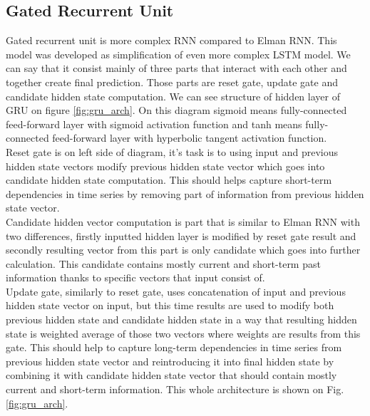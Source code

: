 \subsection{Gated Recurrent Unit}

Gated recurrent unit is more complex RNN compared to Elman RNN. This model was developed as simplification of even more complex LSTM model. We can say that it consist mainly of three parts that interact with each other and together create final prediction. Those parts are reset gate, update gate and candidate hidden state computation. We can see structure of hidden layer of GRU on figure \ref{fig:gru_arch}. On this diagram sigmoid means fully-connected feed-forward layer with sigmoid activation function and tanh means fully-connected feed-forward layer with hyperbolic tangent activation function.
\\

Reset gate is on left side of diagram, it's task is to using input and previous hidden state vectors modify previous hidden state vector which goes into candidate hidden state computation. This should helps capture short-term dependencies in time series by removing part of information from previous hidden state vector.
\\

Candidate hidden vector computation is part that is similar to Elman RNN with two differences, firstly inputted hidden layer is modified by reset gate result and secondly resulting vector from this part is only candidate which goes into further calculation. This candidate contains mostly current and short-term past information thanks to specific vectors that input consist of. 
\\

Update gate, similarly to reset gate, uses concatenation of input and previous hidden state vector on input, but this time results are used to modify both previous hidden state and candidate hidden state in a way that resulting hidden state is weighted average of those two vectors where weights are results from this gate. This should help to capture long-term dependencies in time series from previous hidden state vector and reintroducing it into final hidden state by combining it with candidate hidden state vector that should contain mostly current and short-term information. This whole architecture is shown on Fig. \ref{fig:gru_arch}.
\\

